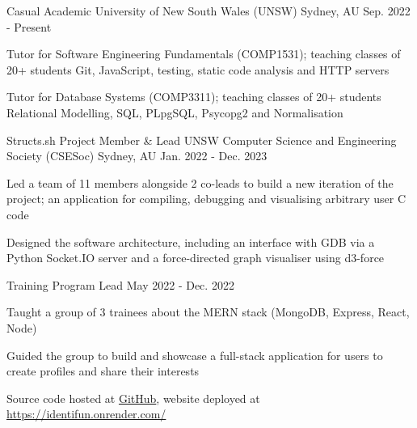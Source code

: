 

\begin{cventries}

  \cventry
    {Casual Academic} %
    {University of New South Wales (UNSW)} %
    {Sydney, AU} %
    {Sep. 2022 - Present} %
    {
      \begin{cvitems} %
        \item {Tutor for Software Engineering Fundamentals (COMP1531); teaching classes of 20+ students Git, JavaScript, testing, static code analysis and HTTP servers}
        \item {Tutor for Database Systems (COMP3311); teaching classes of 20+ students Relational Modelling, SQL, PLpgSQL, Psycopg2 and Normalisation} 
      \end{cvitems}
    }

  \cventry
    {Structs.sh Project Member \& Lead} %
    {UNSW Computer Science and Engineering Society (CSESoc)} %
    {Sydney, AU} %
    {Jan. 2022 - Dec. 2023} %
    {
      \begin{cvitems} %
        \item {Led a team of 11 members alongside 2 co-leads to build a new iteration of the project; an application for compiling, debugging and visualising arbitrary user C code}
        \item {Designed the software architecture, including an interface with GDB via a Python Socket.IO server and a force-directed graph visualiser using d3-force}
      \end{cvitems}
    }

  \cventry
    {Training Program Lead} %
    {}
    {} %
    {May 2022 - Dec. 2022} %
    {
      \begin{cvitems} %
        \item {Taught a group of 3 trainees about the MERN stack (MongoDB, Express, React, Node)}
        \item {Guided the group to build and showcase a full-stack application for users to create profiles and share their interests}
        \item {Source code hosted at \href{https://github.com/csesoc/trainee-4-22t3}{\faGithub GitHub}, website deployed at \url{https://identifun.onrender.com/}}
      \end{cvitems}
    }

\end{cventries}
